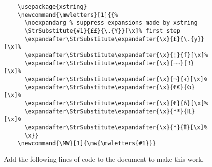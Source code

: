 \begin{figure}
    \centering
    \begin{verbatim}
    \usepackage{xstring}
    \newcommand{\mwletters}[1]{{%
      \noexpandarg % suppress expansions made by xstring
      \StrSubstitute{#1}{££}{\.{Y}}[\x]% first step
      \expandafter\StrSubstitute\expandafter{\x}{£}{\.{y}}[\x]%
      \expandafter\StrSubstitute\expandafter{\x}{¦}{ſ}[\x]%
      \expandafter\StrSubstitute\expandafter{\x}{¬¬}{Ꝛ}[\x]%
      \expandafter\StrSubstitute\expandafter{\x}{¬}{ꝛ}[\x]%
      \expandafter\StrSubstitute\expandafter{\x}{€€}{Ỽ}[\x]%   
      \expandafter\StrSubstitute\expandafter{\x}{€}{ỽ}[\x]%
      \expandafter\StrSubstitute\expandafter{\x}{**}{Ỻ}[\x]%   
      \expandafter\StrSubstitute\expandafter{\x}{*}{ỻ}[\x]%  
      \x}}
    \newcommand{\MW}[1]{\mw{\mwletters{#1}}}
    \end{verbatim}
    \caption{Add the following lines of code to the document to make this work.}
    \label{fig:my_label}
\end{figure}